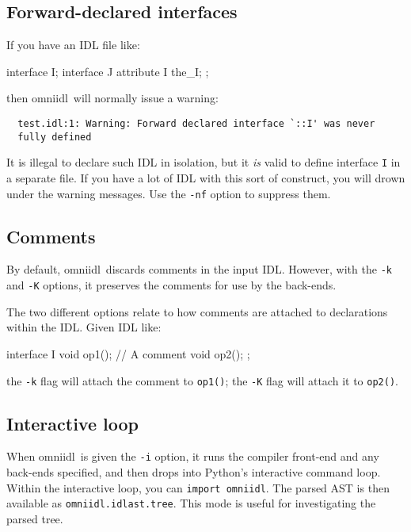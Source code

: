\documentclass[11pt,twoside,a4paper]{article}
\newcommand{\omniidl}{\textsf{omniidl}}
\newcommand{\intf}[1]{\texttt{#1}}
\newcommand{\op}[1]{\texttt{#1()}}
\newcommand{\cmdline}[1]{\texttt{#1}}
\newcommand{\code}[1]{\texttt{#1}}
\begin{document}
\subsection{Forward-declared interfaces}

If you have an IDL file like:

\begin{idllisting}
interface I;
interface J {
  attribute I the_I;
};
\end{idllisting}

\noindent then \omniidl\ will normally issue a warning:

{\small
\begin{verbatim}
  test.idl:1: Warning: Forward declared interface `::I' was never
  fully defined
\end{verbatim}
}

\noindent It is illegal to declare such IDL in isolation, but it
\emph{is} valid to define interface \intf{I} in a separate file. If
you have a lot of IDL with this sort of construct, you will drown
under the warning messages. Use the \cmdline{-nf} option to suppress
them.


\subsection{Comments}
\label{sec:comments}

By default, \omniidl\ discards comments in the input IDL. However,
with the \cmdline{-k} and \cmdline{-K} options, it preserves the
comments for use by the back-ends.

The two different options relate to how comments are attached to
declarations within the IDL. Given IDL like:

\begin{idllisting}
interface I {
  void op1();
  // A comment
  void op2();
};
\end{idllisting}

\noindent the \cmdline{-k} flag will attach the comment to \op{op1};
the \cmdline{-K} flag will attach it to \op{op2}.



\subsection{Interactive loop}

When \omniidl\ is given the \cmdline{-i} option, it runs the compiler
front-end and any back-ends specified, and then drops into Python's
interactive command loop. Within the interactive loop, you can
\code{import omniidl}. The parsed AST is then available as
\code{omniidl.idlast.tree}. This mode is useful for investigating the
parsed tree.
\end{document}
